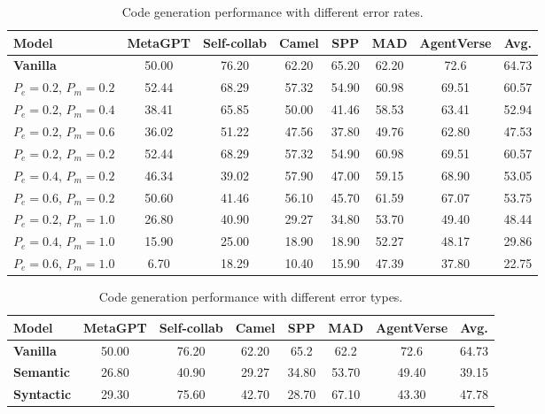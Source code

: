 \documentclass{article}
\theoremstyle{plain}
\theoremstyle{definition}
\theoremstyle{remark}
\begin{document}
\begin{table}[h!]
    \centering
    \caption{Code generation performance with different error rates.}
    \begin{tabular}{lccccccc}
        \toprule
        \bf Model & \bf MetaGPT & \bf Self-collab & \bf Camel & \bf SPP & \bf MAD & \bf AgentVerse & \sc Avg. \\
        \midrule
        \bf Vanilla & 50.00 & 76.20 & 62.20 & 65.20 & 62.20 & 72.6 & 64.73 \\
        \hdashline
        {$P_e=0.2$, $P_m=0.2$} & 52.44 & 68.29 & 57.32 & 54.90 & 60.98 & 69.51 & 60.57 \\
        {$P_e=0.2$, $P_m=0.4$} & 38.41 & 65.85 & 50.00 & 41.46 & 58.53 & 63.41 & 52.94 \\
        {$P_e=0.2$, $P_m=0.6$} & 36.02 & 51.22 & 47.56 & 37.80 & 49.76 & 62.80 & 47.53 \\
        \hdashline
        {$P_e=0.2$, $P_m=0.2$} & 52.44 & 68.29 & 57.32 & 54.90 & 60.98 & 69.51 & 60.57 \\
        {$P_e=0.4$, $P_m=0.2$} & 46.34 & 39.02 & 57.90 & 47.00 & 59.15 & 68.90 & 53.05 \\
        {$P_e=0.6$, $P_m=0.2$} & 50.60 & 41.46 & 56.10 & 45.70 & 61.59 & 67.07 & 53.75 \\
        \hdashline
        {$P_e=0.2$, $P_m=1.0$} & 26.80 & 40.90 & 29.27 & 34.80 & 53.70 & 49.40 & 48.44 \\
        {$P_e=0.4$, $P_m=1.0$} & 15.90 & 25.00 & 18.90 & 18.90 & 52.27 & 48.17 & 29.86 \\
        {$P_e=0.6$, $P_m=1.0$} & 6.70 & 18.29 & 10.40 & 15.90 & 47.39 & 37.80 & 22.75 \\
        \bottomrule
    \end{tabular}
\end{table}

\begin{table}[h!]
    \centering
    \caption{Code generation performance with different error types.}
    \begin{tabular}{lccccccc}
        \toprule
        \bf Model & \bf MetaGPT & \bf Self-collab & \bf Camel & \bf SPP & \bf MAD & \bf AgentVerse & \sc Avg. \\
        \midrule
        \bf Vanilla & 50.00 & 76.20 & 62.20 & 65.2 & 62.2 & 72.6 & 64.73 \\
        \hdashline
        \bf Semantic & 26.80 & 40.90 & 29.27 & 34.80 & 53.70 & 49.40 & 39.15 \\
        \bf Syntactic & 29.30 & 75.60 & 42.70 & 28.70 & 67.10 & 43.30 & 47.78 \\
        \bottomrule
    \end{tabular}
\end{table}
\end{document}
